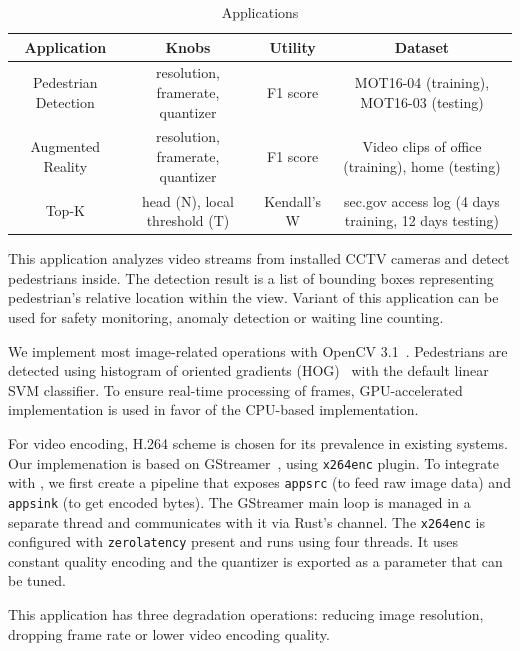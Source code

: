 \begin{table}
  \small
  \centering
  \begin{tabular}{|c|c|c|c|}
    \hline
    Application & Knobs & Utility & Dataset \\
    \hline
    Pedestrian Detection & resolution, framerate, quantizer
                        & F1 score & MOT16-04 (training), MOT16-03 (testing) \\
    \hline
    Augmented Reality & resolution, framerate, quantizer
                        & F1 score & Video clips of office (training), home (testing) \\
    \hline
    Top-K & head (N), local threshold (T) & Kendall's W & sec.gov access log
                                                          (4 days training, 12 days testing)  \\
    \hline
  \end{tabular}
  \caption{\sysname{} Applications}
  \label{tab:apps}
\end{table}

 This application analyzes video streams from
installed CCTV cameras and detect pedestrians inside. The detection result is a
list of bounding boxes representing pedestrian's relative location within the
view. Variant of this application can be used for safety monitoring, anomaly
detection or waiting line counting.

We implement most image-related operations with OpenCV
3.1~\cite{opencvlibrary}. Pedestrians are detected using histogram of oriented
gradients (HOG)~\cite{dalal2005histograms} with the default linear SVM
classifier. To ensure real-time processing of frames, GPU-accelerated
implementation is used in favor of the CPU-based implementation.

For video encoding, H.264 scheme is chosen for its prevalence in existing
systems. Our implemenation is based on GStreamer~\cite{gstreamer}, using
\texttt{x264enc} plugin. To integrate with \sysname{}, we first create a
pipeline that exposes \texttt{appsrc} (to feed raw image data) and
\texttt{appsink} (to get encoded bytes). The GStreamer main loop is managed in a
separate thread and \sysname{} communicates with it via Rust's channel. The
\texttt{x264enc} is configured with \texttt{zerolatency} present and runs using
four threads. It uses constant quality encoding and the quantizer is exported as
a parameter that can be tuned.

This application has three degradation operations: reducing image resolution,
dropping frame rate or lower video encoding quality.

